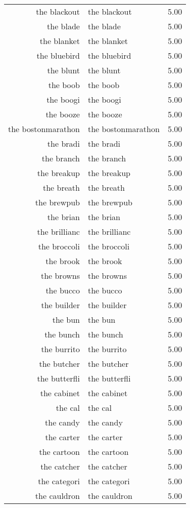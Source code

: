 \begin{table}[ht]
\begin{tabular}{rlr}
  the blackout & the blackout & 5.00 \\ 
  the blade & the blade & 5.00 \\ 
  the blanket & the blanket & 5.00 \\ 
  the bluebird & the bluebird & 5.00 \\ 
  the blunt & the blunt & 5.00 \\ 
  the boob & the boob & 5.00 \\ 
  the boogi & the boogi & 5.00 \\ 
  the booze & the booze & 5.00 \\ 
  the bostonmarathon & the bostonmarathon & 5.00 \\ 
  the bradi & the bradi & 5.00 \\ 
  the branch & the branch & 5.00 \\ 
  the breakup & the breakup & 5.00 \\ 
  the breath & the breath & 5.00 \\ 
  the brewpub & the brewpub & 5.00 \\ 
  the brian & the brian & 5.00 \\ 
  the brillianc & the brillianc & 5.00 \\ 
  the broccoli & the broccoli & 5.00 \\ 
  the brook & the brook & 5.00 \\ 
  the browns & the browns & 5.00 \\ 
  the bucco & the bucco & 5.00 \\ 
  the builder & the builder & 5.00 \\ 
  the bun & the bun & 5.00 \\ 
  the bunch & the bunch & 5.00 \\ 
  the burrito & the burrito & 5.00 \\ 
  the butcher & the butcher & 5.00 \\ 
  the butterfli & the butterfli & 5.00 \\ 
  the cabinet & the cabinet & 5.00 \\ 
  the cal & the cal & 5.00 \\ 
  the candy & the candy & 5.00 \\ 
  the carter & the carter & 5.00 \\ 
  the cartoon & the cartoon & 5.00 \\ 
  the catcher & the catcher & 5.00 \\ 
  the categori & the categori & 5.00 \\ 
  the cauldron & the cauldron & 5.00 \\ 

\end{tabular}
\end{table}
